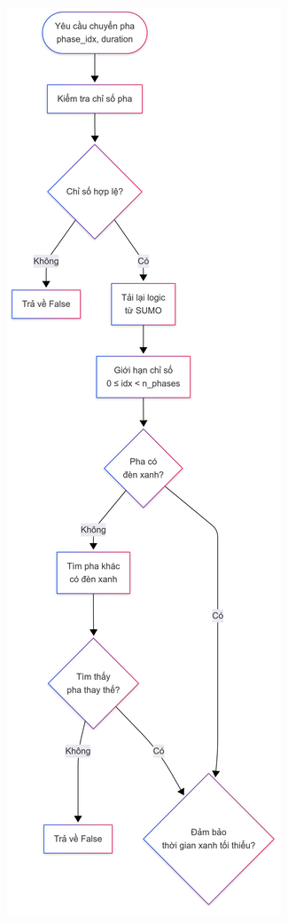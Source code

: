 \documentclass[12pt,a4paper,oneside]{report}
\begin{document}
\begin{figure}[htbp]
    \centering
    \begin{minipage}[t]{0.48\textwidth}
        \centering
        \includegraphics[width=0.9\linewidth]{Untitled diagram _ Mermaid Chart-2025-08-22-064822.png}

\end{minipage}
\end{figure}
\end{document}
